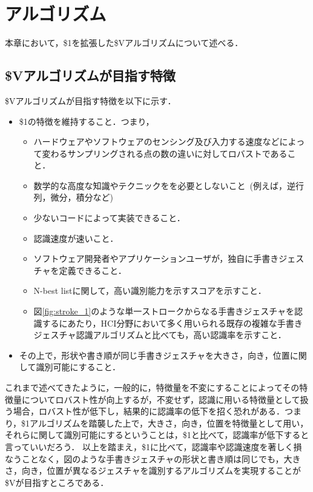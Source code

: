 \chapter{\SysName アルゴリズム}
本章において，\$1を拡張した\$Vアルゴリズムについて述べる．

\section{\$Vアルゴリズムが目指す特徴}
\$Vアルゴリズムが目指す特徴を以下に示す．
\begin{itemize}
\item \$1の特徴を維持すること．つまり，
\begin{itemize}
\item ハードウェアやソフトウェアのセンシング及び入力する速度などによって変わるサンプリングされる点の数の違いに対してロバストであること．
\item 数学的な高度な知識やテクニックをを必要としないこと~(例えば，逆行列，微分，積分など)
\item 少ないコードによって実装できること．
\item 認識速度が速いこと．
\item ソフトウェア開発者やアプリケーションユーザが，独自に手書きジェスチャを定義できること．
\item N-best listに関して，高い識別能力を示すスコアを示すこと．
\item 図\ref{fig:stroke_1}のような単一ストロークからなる手書きジェスチャを認識するにあたり，HCI分野において多く用いられる既存の複雑な手書きジェスチャ認識アルゴリズムと比べても，高い認識率を示すこと．
\end{itemize}
\item その上で，形状や書き順が同じ手書きジェスチャを大きさ，向き，位置に関して識別可能にすること．
\end{itemize}

これまで述べてきたように，一般的に，特徴量を不変にすることによってその特徴量についてロバスト性が向上するが，不変せず，認識に用いる特徴量として扱う場合，ロバスト性が低下し，結果的に認識率の低下を招く恐れがある．つまり，\$1アルゴリズムを踏襲した上で，大きさ，向き，位置を特徴量として用い，それらに関して識別可能にするということは，\$1と比べて，認識率が低下すると言っていいだろう．
以上を踏まえ，\$1に比べて，認識率や認識速度を著しく損なうことなく，図のような手書きジェスチャの形状と書き順は同じでも，大きさ，向き，位置が異なるジェスチャを識別するアルゴリズムを実現することが\$Vが目指すところである．

